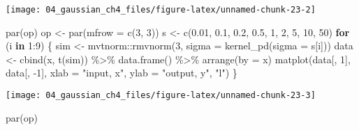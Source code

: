 \documentclass[
]{article}
\newenvironment{Shaded}{\begin{snugshade}}{\end{snugshade}}
\newcommand{\AttributeTok}[1]{\textcolor[rgb]{0.77,0.63,0.00}{#1}}
\newcommand{\ControlFlowTok}[1]{\textcolor[rgb]{0.13,0.29,0.53}{\textbf{#1}}}
\newcommand{\DecValTok}[1]{\textcolor[rgb]{0.00,0.00,0.81}{#1}}
\newcommand{\FloatTok}[1]{\textcolor[rgb]{0.00,0.00,0.81}{#1}}
\newcommand{\FunctionTok}[1]{\textcolor[rgb]{0.00,0.00,0.00}{#1}}
\newcommand{\NormalTok}[1]{#1}
\newcommand{\OtherTok}[1]{\textcolor[rgb]{0.56,0.35,0.01}{#1}}
\newcommand{\SpecialCharTok}[1]{\textcolor[rgb]{0.00,0.00,0.00}{#1}}
\newcommand{\StringTok}[1]{\textcolor[rgb]{0.31,0.60,0.02}{#1}}
\begin{document}
\begin{center}\texttt{[image: 04\_gaussian\_ch4\_files/figure-latex/unnamed-chunk-23-2]} \end{center}

\begin{Shaded}
\begin{Highlighting}[]
\FunctionTok{par}\NormalTok{(op)}
\NormalTok{op }\OtherTok{\textless{}{-}} \FunctionTok{par}\NormalTok{(}\AttributeTok{mfrow =} \FunctionTok{c}\NormalTok{(}\DecValTok{3}\NormalTok{, }\DecValTok{3}\NormalTok{))}
\NormalTok{s }\OtherTok{\textless{}{-}} \FunctionTok{c}\NormalTok{(}\FloatTok{0.01}\NormalTok{, }\FloatTok{0.1}\NormalTok{, }\FloatTok{0.2}\NormalTok{,}
       \FloatTok{0.5}\NormalTok{, }\DecValTok{1}\NormalTok{, }\DecValTok{2}\NormalTok{,}
       \DecValTok{5}\NormalTok{, }\DecValTok{10}\NormalTok{, }\DecValTok{50}\NormalTok{)}
\ControlFlowTok{for}\NormalTok{ (i }\ControlFlowTok{in} \DecValTok{1}\SpecialCharTok{:}\DecValTok{9}\NormalTok{) \{}
\NormalTok{  sim }\OtherTok{\textless{}{-}}\NormalTok{ mvtnorm}\SpecialCharTok{::}\FunctionTok{rmvnorm}\NormalTok{(}\DecValTok{3}\NormalTok{, }\AttributeTok{sigma =} \FunctionTok{kernel\_pd}\NormalTok{(}\AttributeTok{sigma =}\NormalTok{ s[i]))}
\NormalTok{  data }\OtherTok{\textless{}{-}} \FunctionTok{cbind}\NormalTok{(x, }\FunctionTok{t}\NormalTok{(sim)) }\SpecialCharTok{\%\textgreater{}\%}
    \FunctionTok{data.frame}\NormalTok{() }\SpecialCharTok{\%\textgreater{}\%}
    \FunctionTok{arrange}\NormalTok{(}\AttributeTok{by =}\NormalTok{ x)}
  \FunctionTok{matplot}\NormalTok{(data[, }\DecValTok{1}\NormalTok{], data[, }\SpecialCharTok{{-}}\DecValTok{1}\NormalTok{],}
    \AttributeTok{xlab =} \StringTok{"input, x"}\NormalTok{, }
    \AttributeTok{ylab =} \StringTok{"output, y"}\NormalTok{,}
    \StringTok{"l"}\NormalTok{)}
\NormalTok{\}}
\end{Highlighting}
\end{Shaded}

\begin{center}\texttt{[image: 04\_gaussian\_ch4\_files/figure-latex/unnamed-chunk-23-3]} \end{center}

\begin{Shaded}
\begin{Highlighting}[]
\FunctionTok{par}\NormalTok{(op)}
\end{Highlighting}
\end{Shaded}
\end{document}
